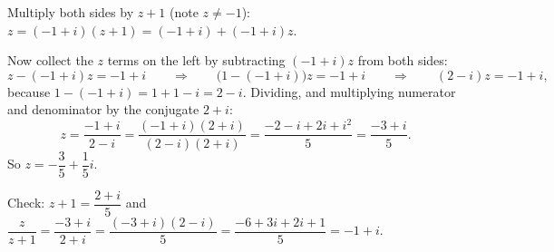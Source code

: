 Multiply both sides by $z+1$ (note $z\ne-1$): $z=(-1+i)(z+1)=(-1+i)+(-1+i)z$.

Now collect the $z$ terms on the left by subtracting $(-1+i)z$ from both sides:
\[
z-(-1+i)z=-1+i\qquad\Longrightarrow\qquad\bigl(1-(-1+i)\bigr)z=-1+i\qquad\Longrightarrow\qquad(2-i)z=-1+i,
\]
because $1-(-1+i)=1+1-i=2-i$. Dividing, and multiplying numerator and denominator by the conjugate $2+i$:
\[
z=\dfrac{-1+i}{2-i}=\dfrac{(-1+i)(2+i)}{(2-i)(2+i)}=\dfrac{-2-i+2i+i^2}{5}=\dfrac{-3+i}{5}.
\]
So $z=\boxed{-\dfrac{3}{5}+\dfrac{1}{5}i}$.

Check: $z+1=\dfrac{2+i}{5}$ and $\dfrac{z}{z+1}=\dfrac{-3+i}{2+i}=\dfrac{(-3+i)(2-i)}{5}=\dfrac{-6+3i+2i+1}{5}=-1+i$.
